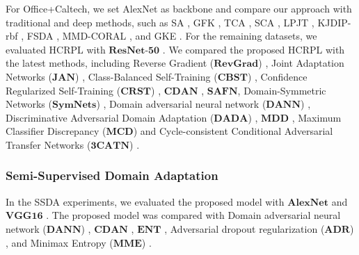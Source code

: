 \documentclass[a4paper,fleqn]{cas-dc}
\begin{document}
	{For Office+Caltech, we set AlexNet \cite{krizhevsky2012imagenet} as backbone and compare our approach with traditional and deep methods, such as SA \cite{6751479}, GFK \cite{gong2012geodesic}, TCA \cite{pan2010domain}, SCA \cite{Ghifary2017ScatterCA}, LPJT \cite{Jingjing2019LocalityPJ}, KJDIP-rbf \cite{Chen2020DomainAB}, FSDA \cite{Sun2019InformativeFS}, MMD-CORAL \cite{Rahman2020OnMD}, and GKE \cite{Wu2020GeometricKE}.} For the remaining datasets,  we evaluated HCRPL with $\textbf{ResNet-50}$ \cite{he2016deep}. We compared the proposed HCRPL with the latest methods, including Reverse Gradient ($\textbf{RevGrad}$) \cite{ganin2014unsupervised}, Joint Adaptation Networks ($\textbf{JAN}$) \cite{long2017deep}, Class-Balanced Self-Training ($\textbf{CBST}$) \cite{zou2018domain}, Confidence Regularized Self-Training ($\textbf{CRST}$) \cite{zou2019confidence}, $\textbf{CDAN}$ \cite{long2018conditional},  $\textbf{SAFN}$\cite{xu2019larger}, Domain-Symmetric Networks ($\textbf{SymNets}$) \cite{zhang2019domain}, Domain adversarial neural network ($\textbf{DANN}$) \cite{ganin2016domain}, Discriminative Adversarial Domain Adaptation ($\textbf{DADA}$)  \cite{tang2019discriminative}, $\textbf{MDD}$ \cite{zhang2019bridging}, Maximum Classifier Discrepancy ($\textbf{MCD}$) \cite{saito2018maximum} and Cycle-consistent Conditional Adversarial Transfer Networks ($\textbf{3CATN}$) \cite{li2019cycle}.
	
	\subsubsection{Semi-Supervised Domain Adaptation} In the SSDA experiments, we evaluated the proposed model with $\textbf{AlexNet}$ \cite{krizhevsky2012imagenet} and $\textbf{VGG16}$ \cite{simonyan2014very}. The proposed model was compared with Domain adversarial neural network ($\textbf{DANN}$) \cite{ganin2016domain}, $\textbf{CDAN}$ \cite{long2018conditional}, $\textbf{ENT}$ \cite{grandvalet2005semi}, Adversarial dropout regularization ($\textbf{ADR}$) \cite{saito2017adversarial}, and Minimax Entropy ($\textbf{MME}$) \cite{saito2019semi}. 
	
\end{document}
